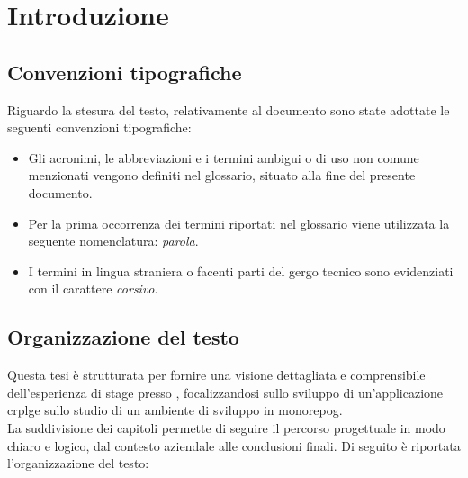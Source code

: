\chapter{Introduzione}
\label{chap:introduzione}

\section{Convenzioni tipografiche}
Riguardo la stesura del testo, relativamente al documento sono state adottate le seguenti convenzioni tipografiche:
\begin{itemize}
	\item Gli acronimi, le abbreviazioni e i termini ambigui o di uso non comune menzionati vengono definiti nel glossario, situato alla fine del presente documento.
	\item Per la prima occorrenza dei termini riportati nel glossario viene utilizzata la seguente nomenclatura: \textit{parola}\glox.
	\item I termini in lingua straniera o facenti parti del gergo tecnico sono evidenziati con il carattere \textit{corsivo}.
\end{itemize}


\section{Organizzazione del testo}
Questa tesi è strutturata per fornire una visione dettagliata e comprensibile dell'esperienza di stage presso \myAzienda,
focalizzandosi sullo sviluppo di un'applicazione \gls{crplg}\glox e sullo studio di un ambiente di sviluppo in \gls{monorepog}\glox.
\\La suddivisione dei capitoli permette di seguire il percorso progettuale in modo chiaro e logico, dal contesto aziendale alle conclusioni finali. 
Di seguito è riportata l'organizzazione del testo:

